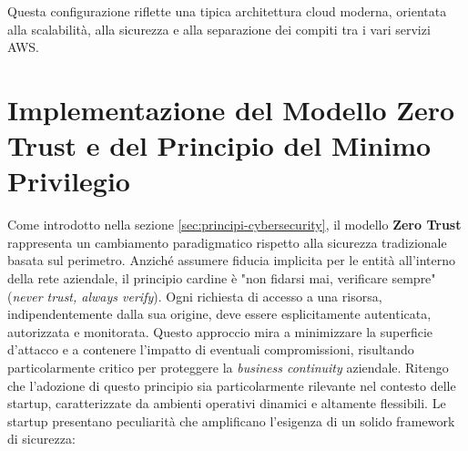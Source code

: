 \documentclass[a4paper,12pt]{report}
\begin{document}
Questa configurazione riflette una tipica architettura cloud moderna, orientata alla scalabilità, alla sicurezza e alla separazione dei compiti tra i vari servizi AWS.




\section{Implementazione del Modello Zero Trust e del Principio del Minimo Privilegio}
\label{sec:zero-trust-implementation}

Come introdotto nella sezione \ref{sec:principi-cybersecurity}, il modello \textbf{Zero Trust} rappresenta un cambiamento paradigmatico rispetto alla sicurezza tradizionale basata sul perimetro. Anziché assumere fiducia implicita per le entità all'interno della rete aziendale, il principio cardine è "non fidarsi mai, verificare sempre" (\textit{never trust, always verify}). Ogni richiesta di accesso a una risorsa, indipendentemente dalla sua origine, deve essere esplicitamente autenticata, autorizzata e monitorata. Questo approccio mira a minimizzare la superficie d'attacco e a contenere l'impatto di eventuali compromissioni, risultando particolarmente critico per proteggere la \textit{business continuity} aziendale. Ritengo che l'adozione di questo principio sia particolarmente rilevante nel contesto delle startup, caratterizzate da ambienti operativi dinamici e altamente flessibili. Le startup presentano peculiarità che amplificano l'esigenza di un solido framework di sicurezza:
\end{document}
